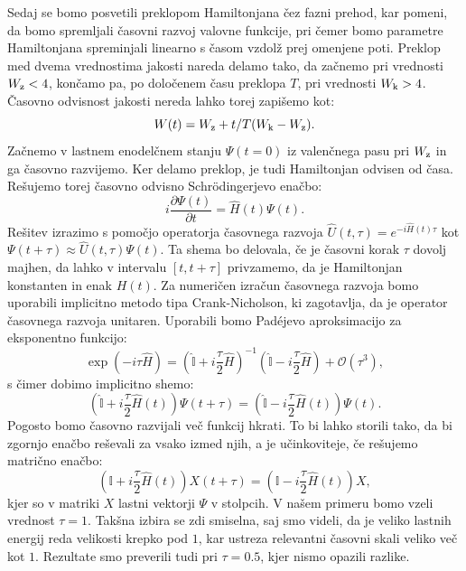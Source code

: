 Sedaj se bomo posvetili preklopom Hamiltonjana čez fazni prehod, kar pomeni, da bomo spremljali časovni razvoj valovne funkcije, pri čemer bomo parametre Hamiltonjana spreminjali linearno s časom vzdolž prej omenjene poti.
Preklop med dvema vrednostima jakosti nareda delamo tako, da začnemo pri vrednosti $W_{\textup{z}}<4$, končamo pa, po določenem času preklopa $T$, pri vrednosti $W_{\textup{k}}>4$.
Časovno odvisnost jakosti nereda lahko torej zapišemo kot: 
\begin{equation}
W(t) = W_{\textup{z}} +  t/T (W_{\textup{k}}-W_{\textup{z}}).
\end{equation} 
Začnemo v lastnem enodelčnem stanju $\Psi(t=0)$ iz valenčnega pasu pri $W_{\textup{z}}$ in ga časovno razvijemo. Ker delamo preklop, je tudi Hamiltonjan odvisen od časa.
Rešujemo torej časovno odvisno Schrödingerjevo enačbo:
\begin{equation}
i \frac{\partial \Psi (t)}{\partial t} = \hat{H}(t) \Psi(t).
\end{equation}
Rešitev izrazimo s pomočjo operatorja časovnega razvoja $\hat{U}(t, \tau) = e^{-i \hat{H}(t) \tau}$ kot $\Psi(t+\tau) \approx \hat{U}(t,\tau) \Psi(t)$.
Ta shema bo delovala, če je časovni korak $\tau$ dovolj majhen, da lahko v intervalu $[t, t+\tau]$ privzamemo, da je Hamiltonjan konstanten in enak $H(t)$. Za numeričen izračun časovnega razvoja bomo uporabili implicitno metodo tipa Crank-Nicholson, ki zagotavlja, da je operator časovnega razvoja unitaren.
Uporabili bomo Padéjevo aproksimacijo za eksponentno funkcijo:
\begin{equation}
\exp (-i \tau \hat{H}) = \left(\hat{\mathbb{I}} + i \frac{\tau}{2} \hat{H} \right)^{-1}   \left(\hat{\mathbb{I}} - i \frac{\tau}{2} \hat{H} \right) + \mathcal{O}(\tau^3),
\end{equation} 
s čimer dobimo implicitno shemo:
\begin{equation}
\left( \hat{\mathbb{I}} + i \frac{\tau}{2} \hat{H}(t) \right) \Psi (t+\tau) = \left(\hat{\mathbb{I}}- i \frac{\tau}{2} \hat{H}(t) \right) \Psi(t).
\end{equation}
Pogosto bomo časovno razvijali več funkcij hkrati. To bi lahko storili tako, da bi zgornjo enačbo reševali za vsako izmed njih, a je učinkoviteje, če rešujemo matrično enačbo:
\begin{equation}
\left( \mathbb{I} + i \frac{\tau}{2} \hat{H}(t) \right) X(t+\tau) = \left(\mathbb{I}- i \frac{\tau}{2} \hat{H}(t) \right) X,
\end{equation}
kjer so v matriki $X$ lastni vektorji $\Psi$ v stolpcih.
V našem primeru bomo vzeli vrednost $\tau=1$. Takšna izbira se zdi smiselna, saj smo videli, da je veliko lastnih energij reda velikosti krepko pod $1$, kar ustreza relevantni časovni skali veliko več kot $1$. Rezultate smo preverili tudi pri $\tau=0.5$, kjer nismo opazili razlike.

